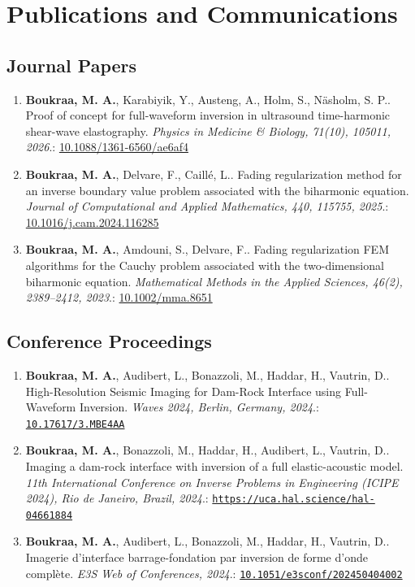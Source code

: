 \documentclass[10pt]{article}
\begin{document}
\section{Publications and Communications}
\subsection{Journal Papers}
\begin{enumerate}
\item \textbf{Boukraa, M. A.}, Karabiyik, Y., Austeng, A., Holm, S., Näsholm, S. P.. Proof of concept for full-waveform inversion in ultrasound time-harmonic shear-wave elastography. \textit{Physics in Medicine \& Biology, 71(10), 105011, 2026}.: \href{https://doi.org/10.1088/1361-6560/ae6af4}{10.1088/1361-6560/ae6af4}
\item \textbf{Boukraa, M. A.}, Delvare, F., Caill{\'e}, L.. Fading regularization method for an inverse boundary value problem associated with the biharmonic equation. \textit{Journal of Computational and Applied Mathematics, 440, 115755, 2025}.: \href{https://doi.org/10.1016/j.cam.2024.116285}{10.1016/j.cam.2024.116285}
\item \textbf{Boukraa, M. A.}, Amdouni, S., Delvare, F.. Fading regularization FEM algorithms for the Cauchy problem associated with the two-dimensional biharmonic equation. \textit{Mathematical Methods in the Applied Sciences, 46(2), 2389--2412, 2023}.: \href{https://doi.org/10.1002/mma.8651}{10.1002/mma.8651}
\end{enumerate}

\subsection{Conference Proceedings}
\begin{enumerate}
\item \textbf{Boukraa, M. A.}, Audibert, L., Bonazzoli, M., Haddar, H., Vautrin, D.. High-Resolution Seismic Imaging for Dam-Rock Interface using Full-Waveform Inversion. \textit{Waves 2024, Berlin, Germany, 2024}.: \href{https://doi.org/10.17617/3.MBE4AA}{\nolinkurl{10.17617/3.MBE4AA}}
\item \textbf{Boukraa, M. A.}, Bonazzoli, M., Haddar, H., Audibert, L., Vautrin, D.. Imaging a dam-rock interface with inversion of a full elastic-acoustic model. \textit{11th International Conference on Inverse Problems in Engineering (ICIPE 2024), Rio de Janeiro, Brazil, 2024}.: \href{https://uca.hal.science/hal-04661884}{\nolinkurl{https://uca.hal.science/hal-04661884}}
\item \textbf{Boukraa, M. A.}, Audibert, L., Bonazzoli, M., Haddar, H., Vautrin, D.. Imagerie d'interface barrage-fondation par inversion de forme d'onde complète. \textit{E3S Web of Conferences, 2024}.: \href{https://doi.org/10.1051/e3sconf/202450404002}{\nolinkurl{10.1051/e3sconf/202450404002}}
\end{enumerate}
\end{document}
